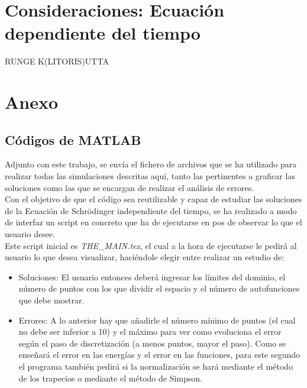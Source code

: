 \documentclass[12pt]{article}
\begin{document}
\section{Consideraciones: Ecuación dependiente del tiempo}

RUNGE K(LITORIS)UTTA 



















\newpage
\section{Anexo}
\subsection{Códigos de MATLAB}
Adjunto con este trabajo, se envía el fichero de archivos que se ha utilizado para realizar todas las simulaciones descritas aquí, tanto las pertinentes a graficar las soluciones como las que se encargan de realizar el análisis de errores.\\

Con el objetivo de que el código sea reutilizable y capaz de estudiar las soluciones de la Ecuación de Schrödinger independiente del tiempo, se ha realizado a modo de interfaz un script en concreto que ha de ejecutarse en pos de observar lo que el usuario desee.\\

Este script inicial es \textit{THE\_MAIN.tex}, el cual a la hora de ejecutarse le pedirá al usuario lo que desea visualizar, haciéndole elegir entre realizar un estudio de:

\begin{itemize}
    \item Soluciones: El usuario entonces deberá ingresar los límites del dominio, el número de puntos con los que dividir el espacio y el número de autofunciones que debe mostrar.

    \item Errores: A lo anterior hay que añadirle el número mínimo de puntos (el cual no debe ser inferior a 10) y el máximo para ver como evoluciona el error según el paso de discretización (a menos puntos, mayor el paso). Como se enseñará el error en las energías y el error en las funciones, para este segundo el programa también pedirá si la normalización se hará mediante el método de los trapecios o mediante el método de Simpson.

\end{itemize}
\end{document}
